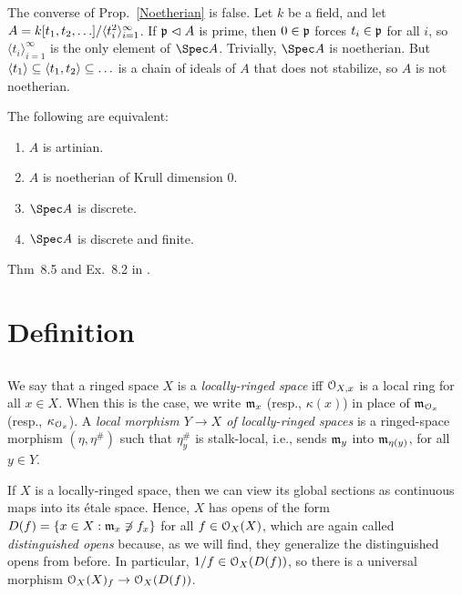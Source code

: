 \documentclass[10pt,final,oneside]{amsbook}
\makeatletter
\renewenvironment{proof}[1][\proofname] 
{ 	
	\par\pushQED{\qed}\normalfont\topsep6\p@\@plus6\p@\relax\trivlist\itemindent\normalparindent
	\item[\hskip\labelsep\itshape#1\@addpunct{.}]\ignorespaces
}
{
	\popQED\endtrivlist\@endpefalse
}
\numberwithin{equation}{section}
\makeatother
\begin{document}
\begin{rem}
The converse of Prop.~\ref{Noetherian} is false.
Let $k$ be a field, and let $A = k[t_1, t_2, \ldots]/{\langle \smash{t_i^2}\rangle_{i = 1}^\infty}$.
If $\fr{p} \normal A$ is prime, then $0 \in \fr{p}$ forces $t_i \in \fr{p}$ for all $i$, so $\langle{t_i}\rangle_{i = 1}^\infty$ is the only element of $\Spec A$.
Trivially, $\Spec A$ is noetherian.
But $\langle{t_1}\rangle \subeq \langle{t_1, t_2}\rangle \subeq \ldots$ is a chain of ideals of $A$ that does not stabilize, so $A$ is not noetherian.
\end{rem}

\begin{prop}
The following are equivalent:
\begin{enumerate}
\item 	$A$ is artinian.
\item 	$A$ is noetherian of Krull dimension $0$.
\item 	$\Spec A$ is discrete.
\item	$\Spec A$ is discrete and finite.
\end{enumerate}
\end{prop}

\begin{proof}
Thm~8.5 and Ex.~8.2 in \cite{AM}.
\end{proof}

\section{Definition}

\subsection{}

We say that a ringed space $X$ is a \emph{locally-ringed space} iff $\cal{O}_{X, x}$ is a local ring for all $x \in  X$.
When this is the case, we write $\fr{m}_x$ (resp., $\kappa(x)$) in place of $\fr{m}_{\cal{O}_x}$ (resp., $\kappa_{\cal{O}_x}$).
A \emph{local morphism $Y \to X$ of locally-ringed spaces} is a ringed-space morphism $(\eta, \eta^\#)$ such that $\eta_y^\#$ is stalk-local, i.e., sends $\fr{m}_y$ into $\fr{m}_{\eta(y)}$, for all $y \in Y$.

If $X$ is a locally-ringed space, then we can view its global sections as continuous maps into its \'etale space.
Hence, $X$ has opens of the form $D(f) = \{x \in X : \fr{m}_x \not\ni f_x\}$ for all $f \in \cal{O}_X(X)$, which are again called \emph{distinguished opens} because, as we will find, they generalize the distinguished opens from before.
In particular, $1/f \in \cal{O}_X(D(f))$, so there is a universal morphism $\cal{O}_X(X)_f \to \cal{O}_X(D(f))$.
\end{document}
